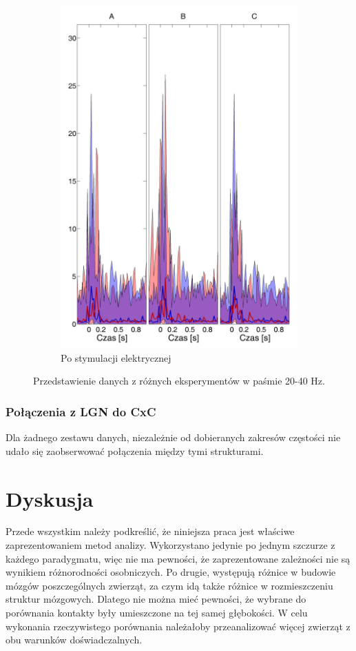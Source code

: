 \documentclass{pracamgr_2}
\begin{document}
\begin{figure}[h]
\begin{subfigure}{.5\textwidth}
			\includegraphics[width=1.\linewidth]{beta3_20-40_z_SC2_do_CxC82.png}
			\caption{Po stymulacji elektrycznej}
			\label{rys:20_40_beta_SC_CxC}
		\end{subfigure}
		\caption{Przedstawienie danych z różnych eksperymentów w paśmie 20-40 Hz.}
		\label{rys:20_40_SC_CxC}
	\end{figure}
	\FloatBarrier
	\subsection{Połączenia z LGN do CxC}
	Dla żadnego zestawu danych, niezależnie od dobieranych zakresów częstości nie udało się zaobserwować połączenia między tymi strukturami.
	\chapter{Dyskusja}
	Przede wszystkim należy podkreślić, że niniejsza praca jest właściwe zaprezentowaniem metod analizy. Wykorzystano jedynie po jednym szczurze z każdego paradygmatu, więc nie ma pewności, że zaprezentowane zależności nie są wynikiem różnorodności osobniczych. Po drugie, występują różnice w budowie mózgów poszczególnych zwierząt, za czym idą także różnice w rozmieszczeniu struktur mózgowych. Dlatego nie można mieć pewności, że wybrane do porównania kontakty były umieszczone na tej samej głębokości. W celu wykonania rzeczywistego porównania należałoby przeanalizować więcej zwierząt z obu warunków doświadczalnych. 
\end{document}
